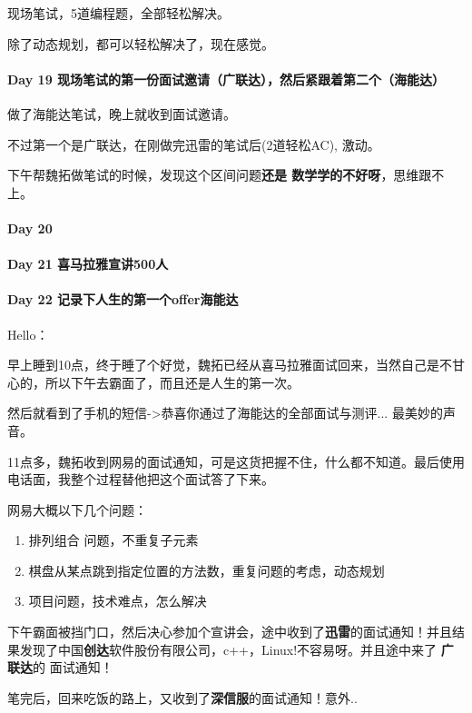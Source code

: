 \documentclass[UTF8,a4paper,8pt]{ctexart}
\begin{document}
	 	 现场笔试，5道编程题，全部轻松解决。
	 	 
	 	 除了动态规划，都可以轻松解决了，现在感觉。
 	 \paragraph{Day 19  现场笔试的第一份面试邀请（广联达），然后紧跟着第二个（海能达）    \quad     }
	 	 做了海能达笔试，晚上就收到面试邀请。
	 	 
	 	 不过第一个是广联达，在刚做完迅雷的笔试后(2道轻松AC), 激动。
	 	 
	 	 下午帮魏拓做笔试的时候，发现这个区间问题\textbf{还是 数学学的不好呀}，思维跟不上。
 	 \paragraph{Day 20      \quad     }
 	 \paragraph{Day 21   喜马拉雅宣讲500人  \quad     }
 	 \paragraph{Day 22   记录下人生的第一个offer海能达   \quad     }
	 	 Hello：
	 	 
	 	 早上睡到10点，终于睡了个好觉，魏拓已经从喜马拉雅面试回来，当然自己是不甘心的，所以下午去霸面了，而且还是人生的第一次。
	 	 
	 	 然后就看到了手机的短信->恭喜你通过了海能达的全部面试与测评... 最美妙的声音。
	 	 
	 	 11点多，魏拓收到网易的面试通知，可是这货把握不住，什么都不知道。最后使用电话面，我整个过程替他把这个面试答了下来。
	 	 
	 	 网易大概以下几个问题：
	 	 
			 	\begin{enumerate}
			 		\item 排列组合 问题，不重复子元素
			 		\item 棋盘从某点跳到指定位置的方法数，重复问题的考虑，动态规划
			 		\item 项目问题，技术难点，怎么解决
			 	\end{enumerate}
			 	
		下午霸面被挡门口，然后决心参加个宣讲会，途中收到了\textbf{迅雷}的面试通知！并且结果发现了中国\textbf{创达}软件股份有限公司，c++，Linux!不容易呀。并且途中来了 \textbf{广联达}的 面试通知！
		
		笔完后，回来吃饭的路上，又收到了\textbf{深信服}的面试通知！意外..
		
\end{document}

